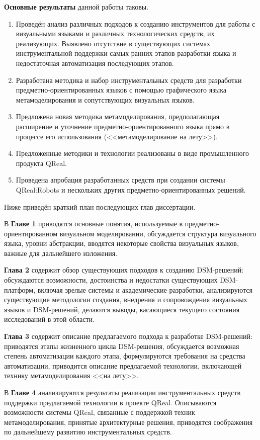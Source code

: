 \textbf{Основные результаты} данной работы таковы.
\begin{enumerate}
	\item Проведён анализ различных подходов к созданию инструментов для работы с визуальными языками и 
		различных технологических средств, их реализующих. Выявлено отсутствие в существующих
		системах инструментальной поддержки самых ранних этапов разработки языка и недостаточная
		автоматизация последующих этапов.
	\item Разработана методика и набор инструментальных средств для разработки 
		предметно-ориентированных языков с помощью графического языка 
		метамоделирования и сопутствующих визуальных языков.
	\item Предложена новая методика метамоделирования, предполагающая расширение 
		и уточнение предметно-ориентированного языка прямо в процессе его 
		использования (<<метамоделирование на лету>>). 
	\item Предложенные методики и технологии реализованы в виде промышленного 
		продукта QReal.
	\item Проведена апробация разработанных средств при создании системы
		QReal:Robots и нескольких других предметно-ориентированных решений.
\end{enumerate}

Ниже приведён краткий план последующих глав диссертации.

В \textbf{Главе 1} приводятся основные понятия, используемые в 
предметно-ориентированном визуальном моделировании, обсуждается структура 
визуального языка, уровни абстракции, вводятся некоторые свойства визуальных 
языков, важные для дальнейшего изложения.

\textbf{Глава 2} содержит обзор существующих подходов к созданию \ac{DSM}-решений: 
обсуждаются возможности, достоинства и недостатки существующих \ac{DSM}-платформ, 
включая зрелые системы и академические разработки, анализируются существующие 
методологии создания, внедрения и сопровождения визуальных языков и \ac{DSM}-решений, 
делаются выводы, касающиеся текущего состояния исследований в этой области.

\textbf{Глава 3} содержит описание предлагаемого подхода к разработке 
\ac{DSM}-решений: приводятся этапы жизненного цикла \ac{DSM}-решения, обсуждается 
возможная степень автоматизации каждого этапа, формулируются требования на 
средства автоматизации, приводится описание предлагаемой технологии, включающей 
технику метамоделирования <<на лету>>.

В \textbf{Главе 4} анализируются результаты реализации инструментальных средств 
поддержки предлагаемой технологии в проекте QReal. Описываются возможности 
системы QReal, связанные с поддержкой техник метамоделирования, принятые 
архитектурные решения, приводятся соображения по дальнейшему развитию 
инструментальных средств.

